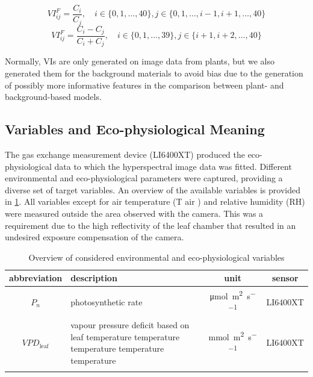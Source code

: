 \documentclass[10pt,authoryear,a4paper,review]{elsarticle}
\begin{document}
        
        \begin{equation}
            VI_{ij}^{F} = \dfrac{C_{i}}{C_{j}}, \quad i \in \{0,1,\ldots, 40\}, j \in \{ 0,1,\ldots,i-1,i+1,\ldots,40\} 
            \label{fraction1}
        \end{equation}
        \begin{equation}
            VI_{ij}^{F} = \dfrac{C_{i} - C_{j}}{C_{i} + C_{j}}, \quad i \in \{0,1,\ldots, 39\}, j \in \{ i+1,i+2,\ldots,40\} 
            \label{fraction2}
        \end{equation}
        
        
        Normally, VIs are only generated on image data from plants, but we also generated them for the background materials to avoid bias due to the generation of possibly more informative features in the comparison between plant- and background-based models. 


    \subsection{Variables and Eco-physiological Meaning}

        The gas exchange measurement device (LI6400XT) produced the eco-physiological data to which 
        the hyperspectral image data was fitted. Different environmental and eco-physiological parameters were captured, providing a diverse set of target variables. An overview of the available variables is provided in \cref{variable-table}. All variables except for air temperature (T air ) and relative humidity (RH) were measured outside the area observed with the camera. This was a requirement due to the high reflectivity of the leaf chamber that resulted in an undesired exposure compensation of the camera. 
        
        \begin{table}[ht]
            \centering
            \caption{Overview of considered environmental and eco-physiological variables}
            \label{variable-table}
            \begin{tabularx}{\linewidth}{cXcc}
                \toprule
                \textbf{abbreviation} & \textbf{description} & \textbf{unit} & \textbf{sensor} \\
                \midrule
                \arrayrulecolor{black!10!white}
                $P_n$ & photosynthetic rate & \si{\micro\mole \per\metre\squared \per\second} & LI6400XT \\
                \midrule
                $VPD_\text{leaf}$ & vapour pressure deficit based on leaf temperature temperature temperature temperature temperature & \si{\milli\mole \per\square\metre \per\second} & LI6400XT \\
                \arrayrulecolor{black}
                \bottomrule
            \end{tabularx}
        \end{table}
    
        
    
    
\end{document}
